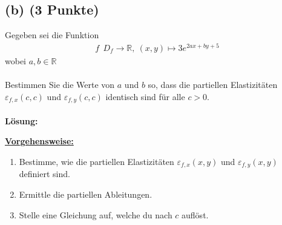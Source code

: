 \subsection*{(b) (3 Punkte)}
Gegeben sei die Funktion
\begin{align*}
f\: \ D_f \to \mathbb{R}, \ (x,y) \mapsto 3 e^{2ax+by+5} 
\end{align*}
wobei $a,b \in \mathbb{R}$
\\ 
\\
Bestimmen Sie die Werte von $a$ und $b$ so, dass die partiellen Elastizitäten $\varepsilon_{f,x}(c,c)$ und $\varepsilon_{f,y}(c,c)$ identisch sind für alle $c > 0 $.
\\
\\
\textbf{Lösung:}
\begin{mdframed}
\underline{\textbf{Vorgehensweise:}}
\begin{enumerate}
\item Bestimme, wie die partiellen Elastizitäten $\varepsilon_{f,x}(x,y)$ und $\varepsilon_{f,y}(x,y)$ definiert sind. 
\item Ermittle die partiellen Ableitungen.
\item Stelle eine Gleichung auf, welche du nach $c$ auflöst.
\end{enumerate}
\end{mdframed}

